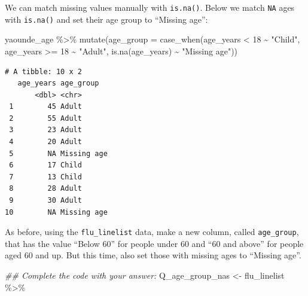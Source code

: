\documentclass[
  letterpaper,
  DIV=11,
  numbers=noendperiod]{scrreprt}
\newenvironment{Shaded}{\begin{snugshade}}{\end{snugshade}}
\newcommand{\AttributeTok}[1]{\textcolor[rgb]{0.40,0.45,0.13}{#1}}
\newcommand{\DecValTok}[1]{\textcolor[rgb]{0.68,0.00,0.00}{#1}}
\newcommand{\DocumentationTok}[1]{\textcolor[rgb]{0.37,0.37,0.37}{\textit{#1}}}
\newcommand{\FunctionTok}[1]{\textcolor[rgb]{0.28,0.35,0.67}{#1}}
\newcommand{\NormalTok}[1]{\textcolor[rgb]{0.00,0.23,0.31}{#1}}
\newcommand{\OtherTok}[1]{\textcolor[rgb]{0.00,0.23,0.31}{#1}}
\newcommand{\SpecialCharTok}[1]{\textcolor[rgb]{0.37,0.37,0.37}{#1}}
\newcommand{\StringTok}[1]{\textcolor[rgb]{0.13,0.47,0.30}{#1}}
\begin{document}
We can match missing values manually with \texttt{is.na()}. Below we
match \texttt{NA} ages with \texttt{is.na()} and set their age group to
``Missing age'':

\begin{Shaded}
\begin{Highlighting}[]
\NormalTok{yaounde\_age }\SpecialCharTok{\%\textgreater{}\%}  
  \FunctionTok{mutate}\NormalTok{(}\AttributeTok{age\_group =} \FunctionTok{case\_when}\NormalTok{(age\_years }\SpecialCharTok{\textless{}} \DecValTok{18} \SpecialCharTok{\textasciitilde{}} \StringTok{"Child"}\NormalTok{, }
\NormalTok{                               age\_years }\SpecialCharTok{\textgreater{}=} \DecValTok{18} \SpecialCharTok{\textasciitilde{}} \StringTok{"Adult"}\NormalTok{, }
                               \FunctionTok{is.na}\NormalTok{(age\_years) }\SpecialCharTok{\textasciitilde{}} \StringTok{"Missing age"}\NormalTok{))}
\end{Highlighting}
\end{Shaded}

\begin{verbatim}
# A tibble: 10 x 2
   age_years age_group  
       <dbl> <chr>      
 1        45 Adult      
 2        55 Adult      
 3        23 Adult      
 4        20 Adult      
 5        NA Missing age
 6        17 Child      
 7        13 Child      
 8        28 Adult      
 9        30 Adult      
10        NA Missing age
\end{verbatim}

\begin{tcolorbox}[enhanced jigsaw, colframe=quarto-callout-tip-color-frame, rightrule=.15mm, opacityback=0, breakable, coltitle=black, colbacktitle=quarto-callout-tip-color!10!white, bottomrule=.15mm, leftrule=.75mm, toprule=.15mm, arc=.35mm, bottomtitle=1mm, colback=white, left=2mm, opacitybacktitle=0.6, titlerule=0mm, title=\textcolor{quarto-callout-tip-color}{\faLightbulb}\hspace{0.5em}{Practice}, toptitle=1mm]

As before, using the \texttt{flu\_linelist} data, make a new column,
called \texttt{age\_group}, that has the value ``Below 60'' for people
under 60 and ``60 and above'' for people aged 60 and up. But this time,
also set those with missing ages to ``Missing age''.

\begin{Shaded}
\begin{Highlighting}[]
\DocumentationTok{\#\# Complete the code with your answer:}
\NormalTok{Q\_age\_group\_nas }\OtherTok{\textless{}{-}} 
\NormalTok{  flu\_linelist }\SpecialCharTok{\%\textgreater{}\%} 
\end{Highlighting}
\end{Shaded}

\end{tcolorbox}
\end{document}
